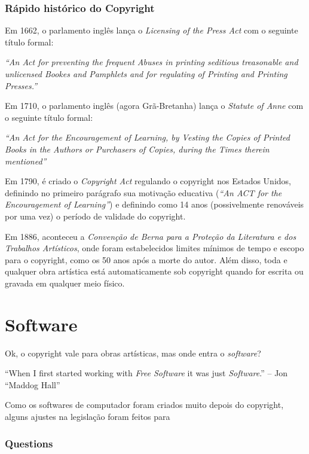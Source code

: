 \documentclass[serif,mathserif]{beamer}
\begin{document}
\begin{frame}
  \frametitle{Rápido histórico do Copyright}
  Em 1662, o parlamento inglês lança o \emph{Licensing of the Press Act} com o seguinte título formal: \pause
  
  \textit{``An Act for preventing the frequent Abuses in \alert<3>{printing} seditious treasonable and unlicensed Bookes and Pamphlets and for regulating of \alert<3>{Printing} and \alert<3>{Printing Presses}.''}\pause

  \pause
  
  \vspace{5mm} %
  Em 1710, o parlamento inglês (agora Grã-Bretanha) lança o \emph{Statute of Anne} com o seguinte título formal: \pause
  
  \textit{``An Act for the \alert<6>{Encouragement of Learning}, by Vesting the Copies of Printed Books in the Authors or Purchasers of Copies, during the Times therein mentioned''}
  \pause
  
\end{frame}
  
\begin{frame}
  Em 1790, é criado o \emph{Copyright Act} regulando o copyright nos Estados Unidos, definindo no primeiro parágrafo sua motivação educativa (\textit{``An \emph{ACT} for the \emph{Encouragement} of \emph{Learning}''}) e definindo como 14 anos (possivelmente renováveis por uma vez) o período de validade do copyright.\pause
  
  \vspace{5mm} %
  Em 1886, aconteceu a \emph{Convenção de Berna para a Proteção da Literatura e dos Trabalhos Artísticos}, onde foram
  estabelecidos limites mínimos de tempo e escopo para o copyright, como os 50 anos após a morte do autor. Além disso,
  toda e qualquer obra artística está automaticamente sob copyright quando for escrita ou gravada em qualquer meio físico. 

\end{frame}

\section{Software} %

\begin{frame}
  Ok, o copyright vale para obras artísticas, mas onde entra o \emph{software}? \pause
    
  \vspace{5mm} %
  ``When I first started working with \emph{Free Software} it was just \emph{Software}.'' -- Jon ``Maddog Hall'' \pause
  
  Como os softwares de computador foram criados muito depois do copyright, alguns ajustes na legislação foram feitos
  para 
\end{frame}

\begin{frame}
  \frametitle{Questions}
\end{frame}
\end{document}
